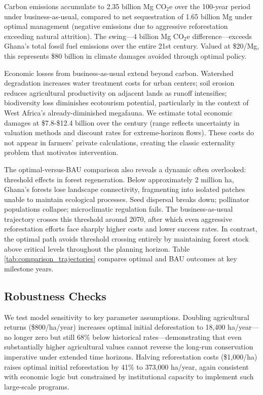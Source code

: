 Carbon emissions accumulate to 2.35 billion Mg CO$_2$e over the 100-year period under business-as-usual, compared to net sequestration of 1.65 billion Mg under optimal management (negative emissions due to aggressive reforestation exceeding natural attrition). The swing—4 billion Mg CO$_2$e difference—exceeds Ghana's total fossil fuel emissions over the entire 21st century. Valued at \$20/Mg, this represents \$80 billion in climate damages avoided through optimal policy.

Economic losses from business-as-usual extend beyond carbon. Watershed degradation increases water treatment costs for urban centers; soil erosion reduces agricultural productivity on adjacent lands as runoff intensifies; biodiversity loss diminishes ecotourism potential, particularly in the context of West Africa's already-diminished megafauna. We estimate total economic damages at \$7.8-\$12.4 billion over the century (range reflects uncertainty in valuation methods and discount rates for extreme-horizon flows). These costs do not appear in farmers' private calculations, creating the classic externality problem that motivates intervention.

The optimal-versus-BAU comparison also reveals a dynamic often overlooked: threshold effects in forest regeneration. Below approximately 2 million ha, Ghana's forests lose landscape connectivity, fragmenting into isolated patches unable to maintain ecological processes. Seed dispersal breaks down; pollinator populations collapse; microclimatic regulation fails. The business-as-usual trajectory crosses this threshold around 2070, after which even aggressive reforestation efforts face sharply higher costs and lower success rates. In contrast, the optimal path avoids threshold crossing entirely by maintaining forest stock above critical levels throughout the planning horizon. Table \ref{tab:comparison_trajectories} compares optimal and BAU outcomes at key milestone years.



\subsection{Robustness Checks}

We test model sensitivity to key parameter assumptions. Doubling agricultural returns (\$800/ha/year) increases optimal initial deforestation to 18,400 ha/year—no longer zero but still 68\% below historical rates—demonstrating that even substantially higher agricultural values cannot reverse the long-run conservation imperative under extended time horizons. Halving reforestation costs (\$1,000/ha) raises optimal initial reforestation by 41\% to 373,000 ha/year, again consistent with economic logic but constrained by institutional capacity to implement such large-scale programs.

